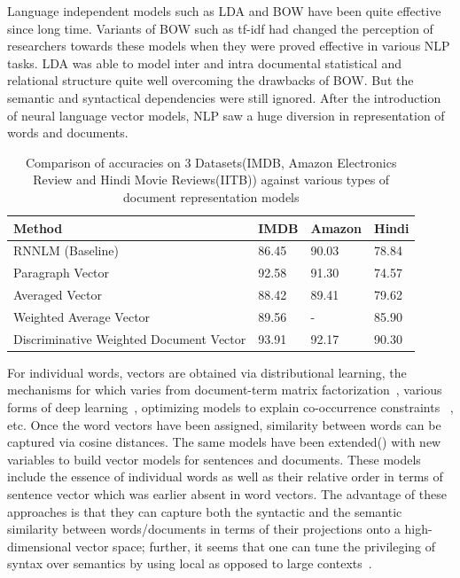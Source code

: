 \documentclass[11pt,a4paper]{article}
\begin{document}
Language independent models such as LDA  and BOW have been quite effective since long time. Variants of BOW such as tf-idf had changed the perception of researchers towards these models when they were proved effective in various NLP tasks. LDA was able to model inter and intra documental statistical and relational structure quite well overcoming the drawbacks of BOW. But the semantic and syntactical dependencies were still ignored. After the introduction of neural language vector models, NLP saw a huge diversion in representation of words and documents.
\begin{table}[h]
\centering
\small
\begin{tabular}{|p{3.2cm}|l|l|l|}
\hline
\textbf{Method}                                                             & \textbf{IMDB}  & \textbf{Amazon} & \textbf{Hindi} \\ \hline
RNNLM (Baseline)                                               & 86.45          & 90.03           & 78.84          \\ \hline
Paragraph Vector \cite{Le:14}                                               & 92.58          & 91.30           & 74.57          \\ \hline
Averaged Vector                                                             & 88.42          & 89.41           & 79.62          \\ \hline
Weighted Average Vector                                                            & 89.56          & -               & 85.90          \\ \hline
Discriminative Weighted Document Vector                                     & 93.91          & 92.17               & 90.30         \\ \hline
\end{tabular}
\caption {Comparison of accuracies on 3 Datasets(IMDB, Amazon Electronics Review and Hindi Movie Reviews(IITB)) against various types of document representation models}
\label{table:3Datasets}
\end{table}
For individual words, vectors are obtained via distributional learning, the mechanisms for which varies from document-term matrix factorization~\cite{Landauer:97}, various forms of deep learning~\cite{Collobert:08,Turian:10,Socher:13}, optimizing models to explain co-occurrence constraints ~\cite{Mikolov:13a,Pennington:14}, etc. Once the word vectors have been assigned, similarity between words can be captured via cosine distances. The same models have been extended(\cite{Le:14}) with new variables to build vector models for sentences and documents. These models include the essence of individual words as well as their relative order in terms of sentence vector which was earlier absent in word vectors. The advantage of these approaches is that they can capture both the syntactic and the semantic similarity between words/documents in terms of their projections onto a high-dimensional vector space; further, it seems that one can tune the privileging of syntax over semantics by using local as opposed to large contexts~\cite{Huang:12}.
\end{document}
